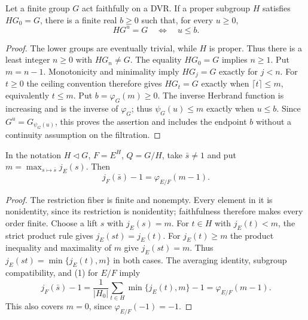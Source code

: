 \begin{lemma}
\label{fw:finite-first-upper-break}
\leanok
Let a finite group $G$ act faithfully on a DVR. If a proper
subgroup $H$ satisfies $HG_0=G$, there is a finite real $b\geq0$
such that, for every $u\geq0$,
\[
 HG^u=G\quad\Longleftrightarrow\quad u\leq b.
\]
\end{lemma}
\begin{proof}
The lower groups are eventually trivial, while $H$ is proper.
Thus there is a least integer $n\geq0$ with $HG_n\ne G$.
The equality $HG_0=G$ implies $n\geq1$. Put $m=n-1$.
Monotonicity and minimality imply $HG_j=G$ exactly for $j<n$.
For $t\geq0$ the ceiling convention therefore gives
$HG_t=G$ exactly when $\lceil t\rceil\leq m$, equivalently
$t\leq m$. Put $b=\varphi_G(m)\geq0$. The inverse Herbrand
function is increasing and is the inverse of $\varphi_G$;
thus $\psi_G(u)\leq m$ exactly when $u\leq b$.
Since $G^u=G_{\psi_G(u)}$, this proves the assertion and includes
the endpoint $b$ without a continuity assumption on the filtration.
\end{proof}

\begin{lemma}
\label{fw:herbrand-coset-max}
\leanok
In the notation $H\triangleleft G$, $F=E^H$, $Q=G/H$, take
$\bar s\ne1$ and put $m=\max_{s\mapsto\bar s}j_E(s)$. Then
\[
 j_F(\bar s)-1=\varphi_{E/F}(m-1).
\]
\end{lemma}
\begin{proof}
The restriction fiber is finite and nonempty. Every element in it is
nonidentity, since its restriction is nonidentity; faithfulness therefore
makes every order finite. Choose a lift $s$ with $j_E(s)=m$.
For $t\in H$ with $j_E(t)<m$,
the strict product rule gives $j_E(st)=j_E(t)$.
For $j_E(t)\geq m$ the product inequality and maximality of $m$ give
$j_E(st)=m$. Thus $j_E(st)=\min\{j_E(t),m\}$ in both cases.
The averaging identity, subgroup compatibility, and (1) for $E/F$ imply
\[
 j_F(\bar s)-1=
 \frac1{|H_0|}\sum_{t\in H}\min\{j_E(t),m\}-1
 =\varphi_{E/F}(m-1).
\]
This also covers $m=0$, since $\varphi_{E/F}(-1)=-1$.
\end{proof}

